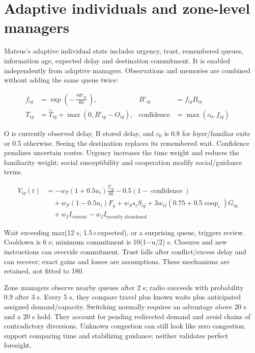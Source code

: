 \documentclass[11pt,a4paper]{article}
\begin{document}
\section{Adaptive individuals and zone-level managers}\label{sec:10}

Mateus's adaptive individual state includes urgency, trust, remembered queues, information age, expected delay and destination commitment. It is enabled independently from adaptive managers. Observations and memories are combined without adding the same queue twice:


\begin{equation}
\begin{aligned}
f_{ig}&=\exp\!\left(-\frac{\operatorname{age}_{ig}}{60}\right), & B'_{ig}&=f_{ig}B_{ig} \\
T_{ig}&=\widehat T_{ig}+\max(0,B'_{ig}-O_{ig}), & \operatorname{confidence}&=\max(c_0,f_{ig})
\end{aligned}
\tag{15}\label{eq:15}
\end{equation}

O is currently observed delay, B stored delay, and \ensuremath{c_{0}} is 0.8 for foyer/familiar exits or 0.5 otherwise. Seeing the destination replaces its remembered wait. Confidence penalizes uncertain routes. Urgency increases the time weight and reduces the familiarity weight; social susceptibility and cooperation modify social/guidance terms.


\begin{equation}
\begin{aligned}
V_{ig}(t)&=-w_T(1+0.5u_i)\frac{T_{ig}}{30}-0.5(1-\operatorname{confidence}) \\
&\quad+w_F(1-0.5u_i)F_g+w_Ss_iS_{ig}+3w_G(0.75+0.5\operatorname{coop}_i)G_{ig} \\
&\quad+w_II_{\mathrm{current}}-w_II_{\mathrm{recently\ abandoned}}
\end{aligned}
\tag{16}\label{eq:16}
\end{equation}

Wait exceeding max(12 s, 1.5\ensuremath{\times}expected), or a surprising queue, triggers review. Cooldown is 6 s; minimum commitment is 10(1\ensuremath{-}u/2) s. Closures and new instructions can override commitment. Trust falls after conflict/excess delay and can recover; exact gains and losses are assumptions. These mechanisms are retained, not fitted to 180.


Zone managers observe nearby queues after 2 s; radio succeeds with probability 0.9 after 3 s. Every 5 s, they compare travel plus known waits plus anticipated assigned demand/capacity. Switching normally requires an advantage above 20 s and a 20 s hold. They account for pending redirected demand and avoid chains of contradictory diversions. Unknown congestion can still look like zero congestion. \cite{R7,R10} support comparing time and stabilizing guidance; neither validates perfect foresight.
\end{document}
